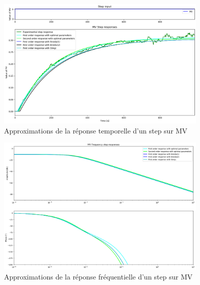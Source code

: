\documentclass{article}
\begin{document}
\begin{figure}[H]
    \centering
    \includegraphics[width=0.9\textwidth]{../Plots/MV_Approximations_comparison_time.png}
    \caption{Approximations de la réponse temporelle d'un step sur MV}
    \label{fig:MV_approximation_comparison_time}
\end{figure}
\begin{figure}[H]
    \centering
    \includegraphics[width=0.9\textwidth]{../Plots/MV_Approximations_comparison_frequency.png}
    \caption{Approximations de la réponse fréquentielle d'un step sur MV}
    \label{fig:MV_approximation_comparison_frequency}
\end{figure}
\end{document}
